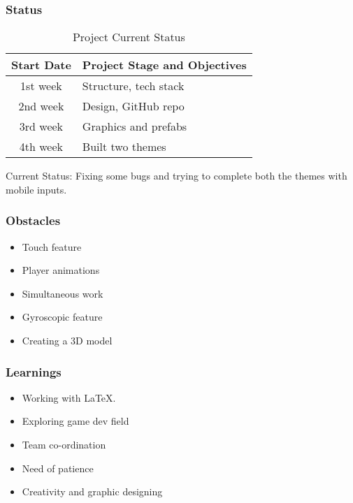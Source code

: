 \documentclass[14pt]{beamer}
\begin{document}
\begin{frame}
    \frametitle{Status}
    \begin{table}
    \begin{tabular}{c | l}
        Start Date & Project Stage and Objectives \\
    \hline \hline
    1st week & Structure, tech stack\\
    2nd week & Design, GitHub repo\\
    3rd week & Graphics and prefabs\\
    4th week & Built two themes\\
    \end{tabular}
    \caption{Project Current Status}
    Current Status: Fixing some bugs and trying to complete both the themes with mobile inputs. 
    \end{table}
\end{frame}

\begin{frame}
    \frametitle{Obstacles}
    \begin{itemize}
    \item Touch feature
    \item Player animations
    \item Simultaneous work
    \item Gyroscopic feature
    \item Creating a 3D model
    \end{itemize}
\end{frame}

\begin{frame}
    \frametitle{Learnings}
    \begin{itemize}
    \item Working with LaTeX.
    \item Exploring game dev field
    \item Team co-ordination
    \item Need of patience
    \item Creativity and graphic designing
    \end{itemize}  
\end{frame}
\end{document}
